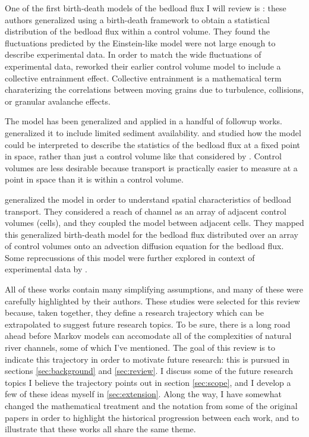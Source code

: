 One of the first birth-death models of the bedload flux I will review is \citet{Ancey2006}: these authors generalized \citet{Einstein1950} using a birth-death framework to obtain a statistical distribution of the bedload flux within a control volume. 
They found the fluctuations predicted by the Einstein-like model were not large enough to describe experimental data.  
In order to match the wide fluctuations of experimental data, \citet{Ancey2008} reworked their earlier control volume model to include a collective entrainment effect.
Collective entrainment is a mathematical term charaterizing the correlations between moving grains due to turbulence, collisions, or granular avalanche effects.

The \citet{Ancey2008} model has been generalized and applied in a handful of followup works. 
\citet{Turowski2009} generalized it to include limited sediment availability. 
\citet{Heyman2013} and \citet{Ma2014} studied how the \citet{Ancey2008} model could be interpreted to describe the statistics of the bedload flux at a fixed point in space, rather than just a control volume like that considered by \citet{Einstein1950}. 
Control volumes are less desirable because transport is practically easier to measure at a point in space than it is within a control volume. 
  
\citet{Ancey2014, Ancey2015} generalized the \citet{Ancey2008} model in order to understand spatial characteristics of bedload transport. 
They considered a reach of channel as an array of adjacent control volumes (cells), and they coupled the \citet{Ancey2008} model between adjacent cells. 
They mapped this generalized birth-death model for the bedload flux distributed over an array of control volumes onto an advection diffusion equation for the bedload flux. 
Some reprecussions of this model were further explored in context of experimental data by \citet{Heyman2014}. 

All of these works contain many simplifying assumptions, and many of these were carefully highlighted by their authors. 
These studies were selected for this review because, taken together, they define a research trajectory which can be extrapolated to suggest future research topics. 
To be sure, there is a long road ahead before Markov models can accomodate all of the complexities of natural river channels, some of which I've mentioned. 
The goal of this review is to indicate this trajectory in order to motivate future research: this is pursued in sections \ref{sec:background} and \ref{sec:review}. 
I discuss some of the future research topics I believe the trajectory points out in section \ref{sec:scope}, and I develop a few of these ideas myself in \ref{sec:extension}. 
Along the way, I have somewhat changed the mathematical treatment and the notation from some of the original papers in order to highlight the historical progression between each work, and to illustrate that these works all share the same theme.  

